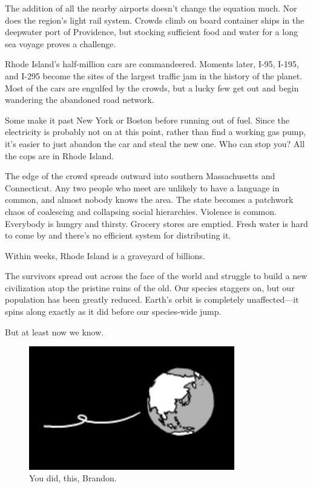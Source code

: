{The addition of all the nearby airports doesn’t change the equation much. Nor does the region’s light rail system. Crowds climb on board container ships in the deepwater port of Providence, but stocking sufficient food and water for a long sea voyage proves a challenge.}

{Rhode Island’s half-million cars are commandeered. Moments later, I-95, I-195, and I-295 become the sites of the largest traffic jam in the history of the planet. Most of the cars are engulfed by the crowds, but a lucky few get out and begin wandering the abandoned road network.}

{Some make it past New York or Boston before running out of fuel. Since the electricity is probably not on at this point, rather than find a working gas pump, it’s easier to just abandon the car and steal the new one. Who can stop you? All the cops are in Rhode Island.}

{The edge of the crowd spreads outward into southern Massachusetts and Connecticut. Any two people who meet are unlikely to have a language in common, and almost nobody knows the area. The state becomes a patchwork chaos of coalescing and collapsing social hierarchies. Violence is common. Everybody is hungry and thirsty. Grocery stores are emptied. Fresh water is hard to come by and there’s no efficient system for distributing it.}

{Within weeks, Rhode Island is a graveyard of billions.}

{The survivors spread out across the face of the world and struggle to build a new civilization atop the pristine ruins of the old. Our species staggers on, but our population has been greatly reduced. Earth’s orbit is completely unaffected—it spins along exactly as it did before our species-wide jump.}

{But at least now we know.}

\begin{figure}[!htbp]
\centering
\includegraphics[scale=0.5, max width=0.8\textwidth]{imgs/a/8/everybody_jump_earth.png}
\caption{You did, this, Brandon.}
\end{figure}

